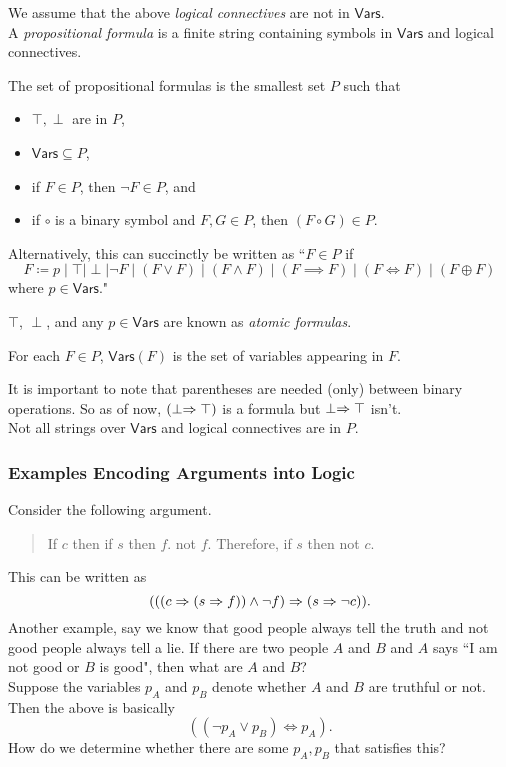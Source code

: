 We assume that the above \textit{logical connectives} are not in $\mathsf{Vars}$.\\
A \textit{propositional formula} is a finite string containing symbols in $\mathsf{Vars}$ and logical connectives.

\begin{definition}
The set of propositional formulas is the smallest set $P$ such that
\begin{itemize}
	\item $\top,\perp$ are in $P$,
	\item $\mathsf{Vars}\subseteq P$,
	\item if $F\in P$, then $\neg F\in P$, and
	\item if $\circ$ is a binary symbol and $F,G\in P$, then $(F\circ G)\in P$.
\end{itemize}
\end{definition}

Alternatively, this can succinctly be written as ``$F \in P$ if
\[F \coloneqq p\mid\top\mid\perp\mid \neg F \mid (F\vee F) \mid (F\wedge F) \mid (F\implies F) \mid (F\iff F) \mid (F\oplus F) \]
where $p\in\mathsf{Vars}$."

\begin{definition}
$\top$, $\perp$, and any $p\in\mathsf{Vars}$ are known as \textit{atomic formulas}.
\end{definition}

\begin{definition}
For each $F\in P$, $\mathsf{Vars}(F)$ is the set of variables appearing in $F$.
\end{definition}

It is important to note that parentheses are needed (only) between binary operations. So as of now, $(\perp\Rightarrow\top)$ is a formula but $\perp\Rightarrow\top$ isn't.\\
Not all strings over $\mathsf{Vars}$ and logical connectives are in $P$.

\subsubsection{Examples Encoding Arguments into Logic}

Consider the following argument.
\begin{quote}
	If $c$ then if $s$ then $f$. not $f$. Therefore, if $s$ then not $c$.
\end{quote}
This can be written as
\[ (((c\Rightarrow (s\Rightarrow f)) \wedge \neg f) \Rightarrow (s \Rightarrow \neg c)). \]
Another example, say we know that good people always tell the truth and not good people always tell a lie. If there are two people $A$ and $B$ and $A$ says ``I am not good or $B$ is good", then what are $A$ and $B$?\\
Suppose the variables $p_A$ and $p_B$ denote whether $A$ and $B$ are truthful or not. Then the above is basically
\[ ((\neg p_A \vee p_B) \iff p_A). \]
How do we determine whether there are some $p_A,p_B$ that satisfies this?

